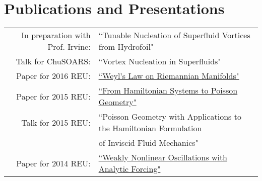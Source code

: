 \documentclass[10pt]{article} %
\begin{document}

\section{Publications and Presentations}

\begin{tabular}{rl}

In preparation with Prof. Irvine:& ``Tunable Nucleation of Superfluid Vortices from Hydrofoil"\\

Talk for ChuSOARS:& ``Vortex Nucleation in Superfluids"\\

Paper for 2016 REU:& \href{http://math.uchicago.edu/~may/REU2016/REUPapers/Musser.pdf}{``Weyl's Law on Riemannian Manifolds"}\\

Paper for 2015 REU:& \href{http://math.uchicago.edu/~may/REUDOCS/Musser.pdf}{``From Hamiltonian Systems to Poisson Geometry"}\\

Talk for 2015 REU:& ``Poisson Geometry with Applications to the Hamiltonian Formulation\\
&of Inviscid Fluid Mechanics"\\

Paper for 2014 REU:& \href{http://math.uchicago.edu/~may/REU2014/REUPapers/Musser.pdf}{``Weakly Nonlinear Oscillations with Analytic Forcing"}\\
\end{tabular}


\end{document}
